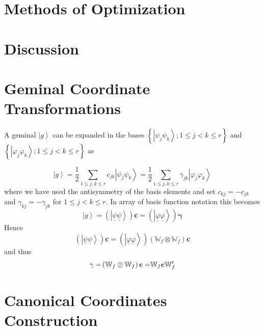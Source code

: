 \documentclass{article}
\begin{document}
\section{Methods of Optimization}


\section{Discussion}

\appendix 

\section{Geminal Coordinate Transformations\label{appengct}}

A geminal $\left| g\right\rangle $ can be expanded in the bases $\left\{
\left| \psi _{j}\psi _{k}\right\rangle ;1\leq j<k\leq r\right\} $ and $%
\left\{ \left| \varphi _{j}\varphi _{k}\right\rangle ;1\leq j<k\leq
r\right\} $ as

\begin{equation}
\left| g\right\rangle =\frac{1}{2}\sum_{1\leq j,k\leq r}c_{jk}\left| \psi
_{j}\psi _{k}\right\rangle =\frac{1}{2}\sum_{1\leq j,k\leq r}\gamma
_{jk}\left| \varphi _{j}\varphi _{k}\right\rangle
\end{equation}%
where we have used the antisymmetry of the basis elements and set $%
c_{kj}=-c_{jk}$ and $\gamma _{kj}=-\gamma _{jk}$ for $1\leq j<k\leq r$. In
array of basis function notation this becomes 
\begin{equation}
\left| g\right\rangle =\left( \left| \underline{\psi }\underline{\psi }%
\right\rangle \right) \mathbf{c}=\left( \left| \underline{\varphi }%
\underline{\varphi }\right\rangle \right) \mathbf{\gamma }
\end{equation}%
Hence 
\begin{equation}
\left( \left| \underline{\psi }\underline{\psi }\right\rangle \right) 
\mathbf{c=}\left( \left| \underline{\varphi }\underline{\varphi }%
\right\rangle \right) \left( \mathbb{W}_{f}\otimes \mathbb{W}_{f}\right) 
\mathbf{c}
\end{equation}%
and thus 
\begin{equation}
\mathbf{\gamma =}\left( \mathbb{W}_{f}\otimes \mathbb{W}_{f}\right) \mathbf{%
c=}\mathbb{W}_{f}\mathbf{c}\mathbb{W}_{f}^{t}
\end{equation}

\section{Canonical Coordinates Construction\label{Appenccc}}
\end{document}
